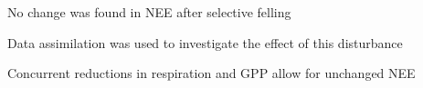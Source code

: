 \documentclass[draft,linenumbers]{agujournal}
\begin{document}







\begin{keypoints}
\item {\color{blue}No change was found in NEE after selective felling}
\item Data assimilation was used to investigate the effect of this disturbance 
\item {\color{blue}Concurrent reductions in respiration and GPP allow for unchanged NEE}
\end{keypoints}

%
%

\end{document}
